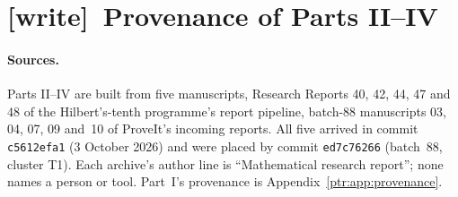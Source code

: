 \documentclass[11pt,letterpaper]{article}
\theoremstyle{definition}\newtheorem{definition}[theorem]{Definition}
\theoremstyle{remark}\newtheorem{remark}[theorem]{Remark}
\newcommand{\wtag}{\textup{[write]}}
\begin{document}
\section*{\wtag\ Provenance of Parts II--IV}
\paragraph{Sources.} Parts II--IV are built from five manuscripts, Research
Reports 40, 42, 44, 47 and 48 of the Hilbert's-tenth programme's report
pipeline, batch-88 manuscripts 03, 04, 07, 09 and~10 of ProveIt's incoming
reports. All five arrived in commit \texttt{c5612efa1} (3 October 2026) and
were placed by commit \texttt{ed7c76266} (batch~88, cluster T1). Each
archive's author line is ``Mathematical research report''; none names a
person or tool. Part~I's provenance is Appendix~\ref{ptr:app:provenance}.
\end{document}
